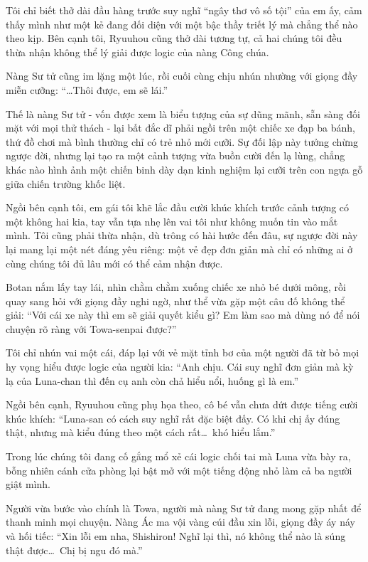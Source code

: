 \documentclass[../main.tex]{subfiles}
\begin{document}
Tôi chỉ biết thở dài đầu hàng trước suy nghĩ ``ngây thơ vô số tội'' của em ấy, cảm thấy mình như một kẻ đang đối diện với một bậc thầy triết lý mà chẳng thể nào theo kịp. Bên cạnh tôi, Ryuuhou cũng thở dài tương tự, cả hai chúng tôi đều thừa nhận không thể lý giải được logic của nàng Công chúa.

Nàng Sư tử cũng im lặng một lúc, rồi cuối cùng chịu nhún nhường với giọng đầy miễn cưỡng: ``\dots Thôi được, em sẽ lái.''

\ct

Thế là nàng Sư tử - vốn được xem là biểu tượng của sự dũng mãnh, sẵn sàng đối mặt với mọi thử thách - lại bất đắc dĩ phải ngồi trên một chiếc xe đạp ba bánh, thứ đồ chơi mà bình thường chỉ có trẻ nhỏ mới cưỡi. Sự đối lập này tưởng chừng ngược đời, nhưng lại tạo ra một cảnh tượng vừa buồn cười đến lạ lùng, chẳng khác nào hình ảnh một chiến binh dày dạn kinh nghiệm lại cưỡi trên con ngựa gỗ giữa chiến trường khốc liệt.

Ngồi bên cạnh tôi, em gái tôi khẽ lắc đầu cười khúc khích trước cảnh tượng có một không hai kia, tay vẫn tựa nhẹ lên vai tôi như không muốn tin vào mắt mình. Tôi cũng phải thừa nhận, dù trông có hài hước đến đâu, sự ngược đời này lại mang lại một nét đáng yêu riêng: một vẻ đẹp đơn giản mà chỉ có những ai ở cùng chúng tôi đủ lâu mới có thể cảm nhận được.


Botan nắm lấy tay lái, nhìn chằm chằm xuống chiếc xe nhỏ bé dưới mông, rồi quay sang hỏi với giọng đầy nghi ngờ, như thể vừa gặp một câu đố không thể giải: ``Với cái xe này thì em sẽ giải quyết kiểu gì? Em làm sao mà dùng nó để nói chuyện rõ ràng với Towa-senpai được?''

Tôi chỉ nhún vai một cái, đáp lại với vẻ mặt tỉnh bơ của một người đã từ bỏ mọi hy vọng hiểu được logic của người kia: ``Anh chịu. Cái suy nghĩ đơn giản mà kỳ lạ của Luna-chan thì đến cụ anh còn chả hiểu nổi, huống gì là em.''

Ngồi bên cạnh, Ryuuhou cũng phụ họa theo, cô bé vẫn chưa dứt được tiếng cười khúc khích: ``Luna-san có cách suy nghĩ rất đặc biệt đấy. Có khi chị ấy đúng thật, nhưng mà kiểu đúng theo một cách rất\dots\ khó hiểu lắm.''

Trong lúc chúng tôi đang cố gắng mổ xẻ cái logic chối tai mà Luna vừa bày ra, bỗng nhiên cánh cửa phòng lại bật mở với một tiếng động nhỏ làm cả ba người giật mình.

Người vừa bước vào chính là Towa, người mà nàng Sư tử đang mong gặp nhất để thanh minh mọi chuyện. Nàng Ác ma vội vàng cúi đầu xin lỗi, giọng đầy áy náy và hối tiếc: ``Xin lỗi em nha, Shishiron! Nghĩ lại thì, nó không thể nào là súng thật được\dots\ Chị bị ngu đó mà.''
\end{document}
